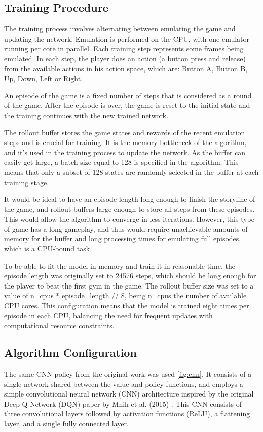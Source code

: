 \documentclass[10pt,conference]{IEEEtran}
\begin{document}
\subsection{Training Procedure}

The training process involves alternating between emulating the game and updating the network. Emulation is performed on the CPU, with one emulator running per core in parallel. Each training step represents some frames being emulated. In each step, the player does an action (a button press and release) from the available actions in his action space, which are: Button A, Button B, Up, Down, Left or Right. 

An episode of the game is a fixed number of steps that is considered as a round of the game. After the episode is over, the game is reset to the initial state and the training continues with the new trained network. 

The rollout buffer stores the game states and rewards of the recent emulation steps and is crucial for training. It is the memory bottleneck of the algorithm, and it's used in the training process to update the network. As the buffer can  easily get large, a batch size equal to 128 is specified in the algorithm. This means that only a subset of 128 states are randomly selected in the buffer at each training stage.

It would be ideal to have an episode length long enough to finish the storyline of the game, and rollout buffers large enough to store all steps from these episodes. This would allow the algorithm to converge in less iterations. However, this type of game has a long gameplay, and thus would require unachievable amounts of memory for the buffer and long processing times for emulating full episodes, which is a CPU-bound task.

To be able to fit the model in memory and train it in reasonable time, the episode length was originally set to 24576 steps, which should be long enough for the player to beat the first gym in the game. The rollout buffer size was set to a value of n\_cpus * episode\_length // 8, being n\_cpus the number of available CPU cores. This configuration means that the model is trained eight times per episode in each CPU, balancing the need for frequent updates with computational resource constraints.





\subsection{Algorithm Configuration}
The same CNN policy from the original work was used \ref{fig:cnn}. It consists of a single network shared between the value and policy functions, and employs a simple convolutional neural network (CNN) architecture inspired by the original Deep Q-Network (DQN) paper by Mnih et al. (2015) \cite{ref:dqn}. This CNN consists of three convolutional layers followed by activation functions (ReLU), a flattening layer, and a single fully connected layer. 
\end{document}
